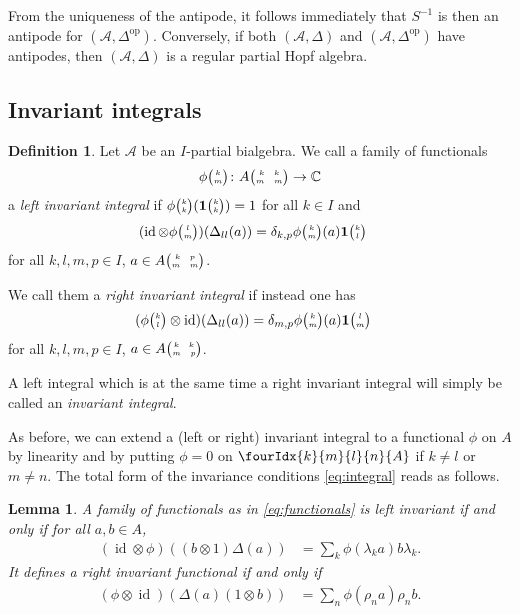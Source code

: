 \documentclass[10pt]{article}
\DeclareMathOperator{\id}{id}
\DeclareMathOperator{\op}{\mathrm{op}}
\newcommand{\C}{\mathbb{C}}
\newcommand{\Grt}[3]{#1{\tiny{\begin{pmatrix} #2\\#3\end{pmatrix}}}}
\newcommand{\UnitC}[2]{\Grt{\mathbf{1}}{#1}{#2}}
\newcommand{\pmat}[4]{{\tiny \begin{pmatrix} #1 \quad #2 \\ #3 \quad #4\end{pmatrix}}}
\newcommand{\Gr}[5]{\fourIdx{#2}{#4}{#3}{#5}{#1}}%
\newtheorem{Lem}[Theorem]{Lemma}
\theoremstyle{definition}
\newtheorem{Def}[Theorem]{Definition}
\newcommand{\phic}[2]{\Grt{\phi}{#1}{#2}}
\numberwithin{equation}{section}
\begin{document}
From the uniqueness of the antipode, it follows immediately that $S^{-1}$ is then an antipode for $(\mathscr{A},\Delta^{\op})$. Conversely, if both $(\mathscr{A},\Delta)$ and $(\mathscr{A},\Delta^{\op})$ have antipodes, then $(\mathscr{A},\Delta)$ is a regular partial Hopf algebra. 

\subsection{Invariant integrals}


\begin{Def}
  Let $\mathscr{A}$ be an $I$-partial bialgebra.  We call a family of
  functionals
\begin{align} \label{eq:functionals}
  \phic{k}{m} \colon A\pmat{k}{k}{m}{m} \to \C
\end{align}
a \emph{left invariant} \emph{integral} if
 $\phic{k}{k}(\UnitC{k}{k})=1$ for all $k\in
I$ and
\begin{align}
  \label{eq:integral}
   (\id \otimes \phic{l}{m})(\Delta_{ll}(a)) 
&= \delta_{k,p} \phic{k}{m}(a)
  \UnitC{k}{l} 
\end{align}
 for all $k,l,m,p\in I$, $a \in A\pmat{k}{p}{m}{m}$. 
 
 We call them a \emph{right invariant}  \emph{integral} if instead one has \begin{align}
  (\phic{k}{l} \otimes
  \id)(\Delta_{ll}(a))&= \delta_{m,p} \phic{k}{m}(a) \UnitC{l}{m}\end{align}
 for all $k,l,m,p\in I$, $a \in A\pmat{k}{k}{m}{p}$. 
 
 A left integral which is at the same time a right invariant integral will simply be called an \emph{invariant integral}.
\end{Def}

As before, we can extend a (left or right) invariant integral to a functional $\phi$ on $A$ by linearity and by putting $\phi=0$ on $\Gr{A}{k}{l}{m}{n}$ if $k\neq l$ or $m\neq n$. The total form of the invariance conditions
\eqref{eq:integral}  reads as follows. 

\begin{Lem} \label{lemma:total-integral}
  A family of functionals  as in   \eqref{eq:functionals}
  is left invariant
  if and only if
for all $a,b\in A$,
  \begin{align*}
(\id\otimes \phi)((b\otimes 1)\Delta(a)) &= \sum_{k}\phi(\lambda_{k}a)b\lambda_k.
      \end{align*}
      It defines a right invariant functional if and only if 
   \begin{align*}   (\phi\otimes \id)(\Delta(a)(1\otimes b)) &= \sum_{n}
\phi(\rho_{n} a)\rho_n b.\end{align*}
\end{Lem}
\end{document}

